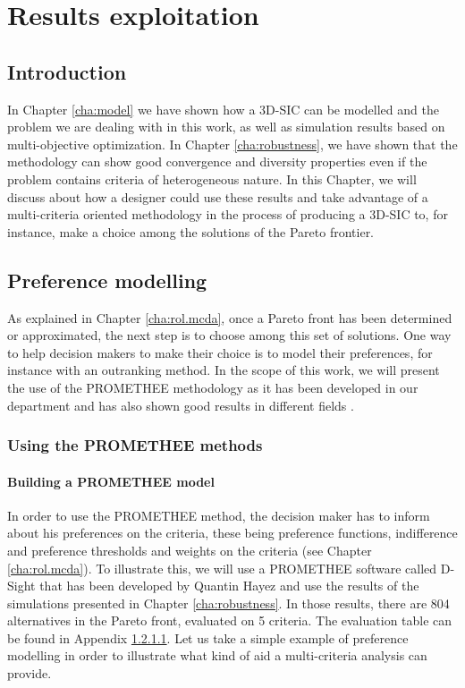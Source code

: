 \chapter{Results exploitation}

\begin{summary}
\lipsum[1]
\end{summary}

\section{Introduction}
In Chapter \ref{cha:model} we have shown how a 3D-SIC can be modelled and the problem we are dealing with in this work, as well as simulation results based on multi-objective optimization. In Chapter \ref{cha:robustness}, we have shown that the methodology can show good convergence and diversity properties even if the problem contains criteria of heterogeneous nature. In this Chapter, we will discuss about how a designer could use these results and take advantage of a multi-criteria oriented methodology in the process of producing a 3D-SIC to, for instance, make a choice among the solutions of the Pareto frontier.

\section{Preference modelling}
As explained in Chapter \ref{cha:rol.mcda}, once a Pareto front has been determined or approximated, the next step is to choose among this set of solutions. One way to help decision makers to make their choice is to model their preferences, for instance with an outranking method. In the scope of this work, we will present the use of the PROMETHEE methodology as it has been developed in our department and has also shown good results in different fields \cite{Beh2010}.

\subsection{Using the PROMETHEE methods}

\subsubsection{Building a PROMETHEE model}
In order to use the PROMETHEE method, the decision maker has to inform about his preferences on the criteria, these being preference functions, indifference and preference thresholds and weights on the criteria (see Chapter \ref{cha:rol.mcda}). To illustrate this, we will use a PROMETHEE software called D-Sight that has been developed by Quantin Hayez and use the results of the simulations presented in Chapter \ref{cha:robustness}. In those results, there are 804 alternatives in the Pareto front, evaluated on 5 criteria. The evaluation table can be found in Appendix \ref{}. Let us take a simple example of preference modelling in order to illustrate what kind of aid a multi-criteria analysis can provide.

